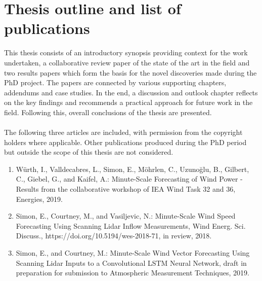 \chapter{Thesis outline and list of publications}
\label{sec:outline}


This thesis consists of an introductory synopsis providing context for the work undertaken, a collaborative review paper of the state of the art in the field and two results papers which form the basis for the novel discoveries made during the PhD project. The papers are connected by various supporting chapters, addendums and case studies. In the end, a discussion and outlook chapter reflects on the key findings and recommends a practical approach for future work in the field. Following this, overall conclusions of the thesis are presented.
\\\\
The following three articles are included, with permission from the copyright holders where applicable.
Other publications produced during the PhD period but outside the scope of this thesis are not considered.
\\
\begin{enumerate}
    \item W\"urth, I., Valldecabres, L., Simon, E., M\"ohrlen, C., Uzuno\u glu, B., Gilbert, C., Giebel, G., and Kaifel, A.: Minute-Scale Forecasting of Wind Power - Results from the collaborative workshop of IEA Wind Task 32 and 36, Energies, 2019.
    
    \item Simon, E., Courtney, M., and Vasiljevic, N.: Minute-Scale Wind Speed Forecasting Using Scanning Lidar Inflow Measurements, Wind Energ. Sci. Discuss., https://doi.org/10.5194/wes-2018-71, in review, 2018.
    
    \item Simon, E., and Courtney, M.: Minute-Scale Wind Vector Forecasting Using Scanning Lidar Inputs to a Convolutional LSTM Neural Network, draft in preparation for submission to Atmospheric Measurement Techniques, 2019.

\end{enumerate}